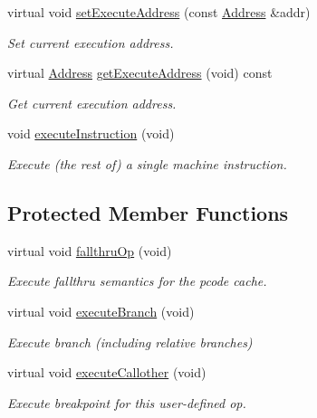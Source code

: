 \begin{DoxyCompactItemize}
virtual void \mbox{\hyperlink{class_emulate_pcode_cache_a732fcebcb6aae1a9e7b9e833df6f1e85}{set\+Execute\+Address}} (const \mbox{\hyperlink{class_address}{Address}} \&addr)
\begin{DoxyCompactList}\small\item\em Set current execution address. \end{DoxyCompactList}\item 
virtual \mbox{\hyperlink{class_address}{Address}} \mbox{\hyperlink{class_emulate_pcode_cache_a0552fb840bb762ee41b4bbc7fce2b608}{get\+Execute\+Address}} (void) const
\begin{DoxyCompactList}\small\item\em Get current execution address. \end{DoxyCompactList}\item 
void \mbox{\hyperlink{class_emulate_pcode_cache_affaf407ab847a7ec409bac7d564c119c}{execute\+Instruction}} (void)
\begin{DoxyCompactList}\small\item\em Execute (the rest of) a single machine instruction. \end{DoxyCompactList}\end{DoxyCompactItemize}
\subsection*{Protected Member Functions}
\begin{DoxyCompactItemize}
\item 
virtual void \mbox{\hyperlink{class_emulate_pcode_cache_a57be50a3c9751a6bcb40bf8c080f7774}{fallthru\+Op}} (void)
\begin{DoxyCompactList}\small\item\em Execute fallthru semantics for the pcode cache. \end{DoxyCompactList}\item 
virtual void \mbox{\hyperlink{class_emulate_pcode_cache_a6108efef1c0291ca887228781e4c1238}{execute\+Branch}} (void)
\begin{DoxyCompactList}\small\item\em Execute branch (including relative branches) \end{DoxyCompactList}\item 
virtual void \mbox{\hyperlink{class_emulate_pcode_cache_a5f90b72957b644a794455f051cb3ad2d}{execute\+Callother}} (void)
\begin{DoxyCompactList}\small\item\em Execute breakpoint for this user-\/defined op. \end{DoxyCompactList}\end{DoxyCompactItemize}

